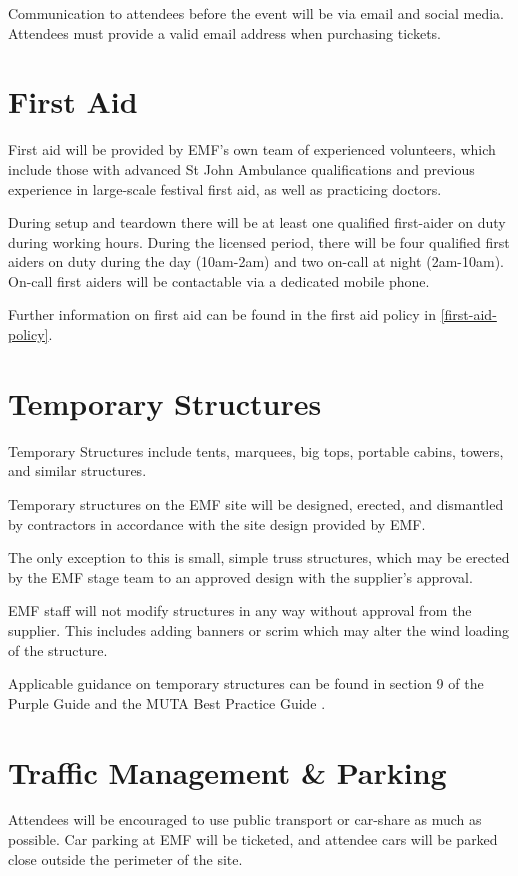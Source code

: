 Communication to attendees before the event will be via email and social
media. Attendees must provide a valid email address when purchasing tickets.

\section{First Aid}

First aid will be provided by EMF's own team of experienced volunteers,
which include those with advanced St John Ambulance qualifications and previous
experience in large-scale festival first aid, as well as practicing doctors.

During setup and teardown there will be at least one qualified first-aider on
duty during working hours. During the licensed period, there will be
four qualified first aiders on duty during the day (10am-2am) and two
on-call at night (2am-10am). On-call first aiders will be contactable via
a dedicated mobile phone.

Further information on first aid can be found in the first aid policy in
\cref{first-aid-policy}.

\section{Temporary Structures}
Temporary Structures include tents, marquees, big tops, portable cabins,
towers, and similar structures.

Temporary structures on the EMF site will be designed, erected, and dismantled
by contractors in accordance with the site design provided by EMF.

The only exception to this is small, simple truss structures, which may be erected
by the EMF stage team to an approved design with the supplier's approval.

EMF staff will not modify structures in any way without approval from the supplier.
This includes adding banners or scrim which may alter the wind loading of the
structure.

Applicable guidance on temporary structures can be found in
section 9 of the Purple Guide \cite{purpleguide} and the MUTA Best Practice
Guide \cite{mutaguide}.

\section{Traffic Management \& Parking}

Attendees will be encouraged to use public transport or car-share as much as
possible. Car parking at EMF will be ticketed, and attendee cars will be
parked close outside the perimeter of the site.

